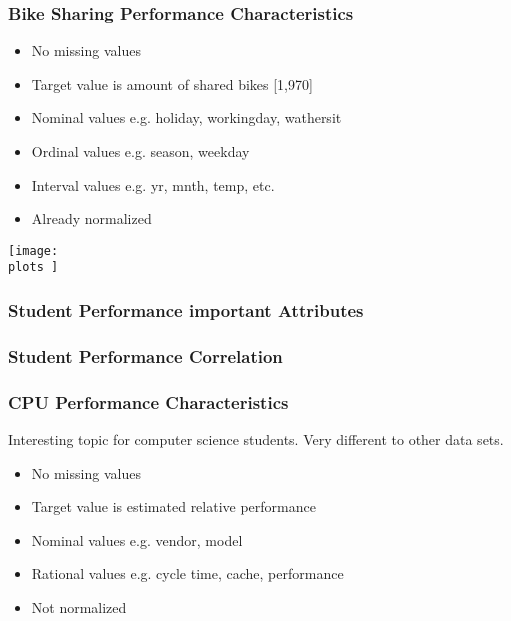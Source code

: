 \documentclass[aspectratio=169]{beamer}
\def \plots {./plots/}
\begin{document}
\begin{frame}{}
\frametitle{Bike Sharing Performance Characteristics}
\begin{minipage}{0.45\textwidth}
\begin{itemize}
\item No missing values
\item Target value is amount of shared bikes [1,970]
\item Nominal values e.g. holiday, workingday, wathersit
\item Ordinal values e.g. season, weekday
\item Interval values e.g. yr, mnth, temp, etc.
\item Already normalized
\end{itemize}
\end{minipage}
\begin{minipage}{0.5\textwidth}
    \texttt{[image: \\plots ]}
\end{minipage}
\end{frame}

\begin{frame}{}
\frametitle{Student Performance important Attributes}
\end{frame}

\begin{frame}{}
\frametitle{Student Performance Correlation}
\end{frame}

\begin{frame}{}
\frametitle{CPU Performance Characteristics}
Interesting topic for computer science students. Very different to other data sets.
\begin{itemize}
\item No missing values
\item Target value is estimated relative performance
\item Nominal values e.g. vendor, model
\item Rational values e.g. cycle time, cache, performance
\item Not normalized
\end{itemize}
\end{frame}
\end{document}
